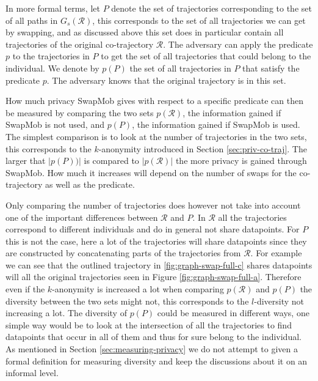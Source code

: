 \documentclass[12pt]{article}
\newcommand{\cotraj}{\mathcal{R}}
\newcommand{\pred}{p}
\newcommand{\paths}{P}
\newcommand{\swapgraph}{G_s}
\theoremstyle{definition}
\begin{document}
In more formal terms, let \(\paths\) denote the set of trajectories
corresponding to the set of all paths in \(\swapgraph(\cotraj)\), this
corresponds to the set of all trajectories we can get by swapping, and
as discussed above this set does in particular contain all
trajectories of the original co-trajectory \(\cotraj\). The adversary
can apply the predicate \(\pred\) to the trajectories in \(\paths\) to
get the set of all trajectories that could belong to the individual.
We denote by \(\pred(\paths)\) the set of all trajectories in
\(\paths\) that satisfy the predicate \(\pred\). The adversary knows
that the original trajectory is in this set.

How much privacy SwapMob gives with respect to a specific predicate
can then be measured by comparing the two sets \(\pred(\cotraj)\), the
information gained if SwapMob is not used, and \(\pred(\paths)\), the
information gained if SwapMob is used. The simplest comparison is to
look at the number of trajectories in the two sets, this corresponds
to the \(k\)-anonymity introduced in Section \ref{sec:priv-co-traj}.
The larger that \(|\pred(\paths))|\) is compared to
\(|\pred(\cotraj)|\) the more privacy is gained through SwapMob. How
much it increases will depend on the number of swaps for the
co-trajectory as well as the predicate.

Only comparing the number of trajectories does however not take into
account one of the important differences between \(\cotraj\) and
\(\paths\). In \(\cotraj\) all the trajectories correspond to
different individuals and do in general not share datapoints. For
\(\paths\) this is not the case, here a lot of the trajectories will
share datapoints since they are constructed by concatenating parts of
the trajectories from \(\cotraj\). For example we can see that the
outlined trajectory in \ref{fig:graph-swap-full-c} shares datapoints
will all the original trajectories seen in Figure
\ref{fig:graph-swap-full-a}. Therefore even if the \(k\)-anonymity is
increased a lot when comparing \(\pred(\cotraj)\) and
\(\pred(\paths)\) the diversity between the two sets might not, this
corresponds to the \(l\)-diversity not increasing a lot. The diversity
of \(\pred(\paths)\) could be measured in different ways, one simple
way would be to look at the intersection of all the trajectories to
find datapoints that occur in all of them and thus for sure belong to
the individual. As mentioned in Section \ref{sec:measuring-privacy} we
do not attempt to given a formal definition for measuring diversity
and keep the discussions about it on an informal level.
\end{document}
